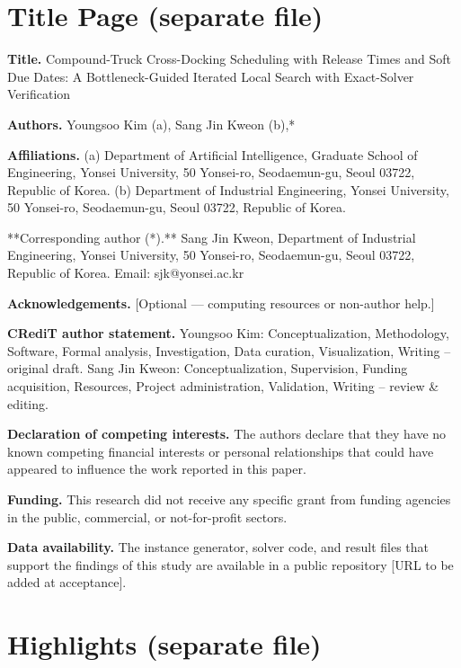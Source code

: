 \documentclass[
]{article}
\author{}
\date{}
\begin{document}
\section{Title Page (separate file)}\label{title-page-separate-file}

\textbf{Title.} Compound-Truck Cross-Docking Scheduling with Release
Times and Soft Due Dates: A Bottleneck-Guided Iterated Local Search with
Exact-Solver Verification

\textbf{Authors.} Youngsoo Kim (a), Sang Jin Kweon (b),*

\textbf{Affiliations.} (a) Department of Artificial Intelligence,
Graduate School of Engineering, Yonsei University, 50 Yonsei-ro,
Seodaemun-gu, Seoul 03722, Republic of Korea. (b) Department of
Industrial Engineering, Yonsei University, 50 Yonsei-ro, Seodaemun-gu,
Seoul 03722, Republic of Korea.

**Corresponding author (*).** Sang Jin Kweon, Department of Industrial
Engineering, Yonsei University, 50 Yonsei-ro, Seodaemun-gu, Seoul 03722,
Republic of Korea. Email: sjk@yonsei.ac.kr

\textbf{Acknowledgements.} {[}Optional --- computing resources or
non-author help.{]}

\textbf{CRediT author statement.} Youngsoo Kim: Conceptualization,
Methodology, Software, Formal analysis, Investigation, Data curation,
Visualization, Writing -- original draft. Sang Jin Kweon:
Conceptualization, Supervision, Funding acquisition, Resources, Project
administration, Validation, Writing -- review \& editing.

\textbf{Declaration of competing interests.} The authors declare that
they have no known competing financial interests or personal
relationships that could have appeared to influence the work reported in
this paper.

\textbf{Funding.} This research did not receive any specific grant from
funding agencies in the public, commercial, or not-for-profit sectors.

\textbf{Data availability.} The instance generator, solver code, and
result files that support the findings of this study are available in a
public repository {[}URL to be added at acceptance{]}.

\newpage

\section{Highlights (separate file)}\label{highlights-separate-file}
\end{document}
